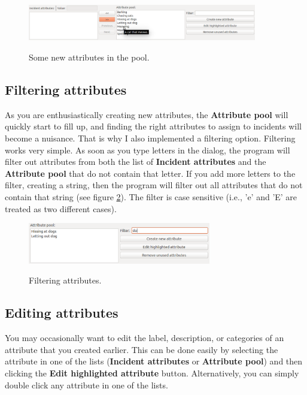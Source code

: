 \documentclass{memoir}
\begin{document}
\begin{figure}[h!]
  \centering
  \caption{Some new attributes in the pool.}
  \includegraphics[width=100mm]{Screenshot_9.pdf}
  \label{fig:attributepool}
\end{figure}

\subsection{Filtering attributes}
\label{sec:filteringattributes}

As you are enthusiastically creating new attributes, the \textbf{Attribute pool} will quickly start to fill up, and finding the right attributes to assign to incidents will become a nuisance. That is why I also implemented a filtering option. Filtering works very simple. As soon as you type letters in the dialog, the program will filter out attributes from both the list of \textbf{Incident attributes} and the \textbf{Attribute pool} that do not contain that letter. If you add more letters to the filter, creating a string, then the program will filter out all attributes that do not contain that string (see figure \ref{fig:filteringattributes}). The filter is case sensitive (i.e., 'e' and 'E' are treated as two different cases). 

\begin{figure}[h!]
  \centering
  \caption{Filtering attributes.}
  \includegraphics[width=80mm]{Screenshot_10.pdf}
  \label{fig:filteringattributes}
\end{figure}

\subsection{Editing attributes}
\label{sec:editingattributes}

You may occasionally want to edit the label, description, or categories of an attribute that you created earlier. This can be done easily by selecting the attribute in one of the lists (\textbf{Incident attributes} or \textbf{Attribute pool}) and then clicking the \textbf{Edit highlighted attribute} button. Alternatively, you can simply double click any attribute in one of the lists.
\end{document}
